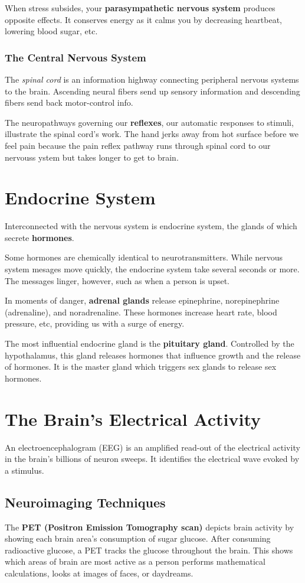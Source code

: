 \documentclass[12pt]{article}
\begin{document}
When stress subsides, your \textbf{parasympathetic nervous system} produces opposite effects. It conserves energy as it calms you by decreasing heartbeat, lowering blood sugar, etc. 

\subsubsection*{The Central Nervous System}
The \textit{spinal cord} is an information highway connecting peripheral nervous systems to the brain. Ascending neural fibers send up sensory information and descending fibers send back motor-control info. 

The neuropathways governing our \textbf{reflexes}, our automatic responses to stimuli, illustrate the spinal cord's work. The hand jerks away from hot surface before we feel pain because the pain reflex pathway runs through spinal cord to our nervouss ystem but takes longer to get to brain.

\section*{Endocrine System}
Interconnected with the nervous system is endocrine system, the glands of which secrete \textbf{hormones}.

Some hormones are chemically identical to neurotransmitters. While nervous system mesages move quickly, the endocrine system take several seconds or more. The messages linger, however, such as when a person is upset.

In moments of danger, \textbf{adrenal glands} release epinephrine, norepinephrine (adrenaline), and noradrenaline. These hormones increase heart rate, blood pressure, etc, providing us with a surge of energy.

The most influential endocrine gland is the \textbf{pituitary gland}. Controlled by the hypothalamus, this gland releases hormones that influence growth and the release of hormones. It is the master gland which triggers sex glands to release sex hormones. 

\section*{The Brain's Electrical Activity}
An electroencephalogram (EEG) is an amplified read-out of the electrical activity in the brain's billions of neuron sweeps. It identifies the electrical wave evoked by a stimulus.

\subsection*{Neuroimaging Techniques}
The \textbf{PET (Positron Emission Tomography scan)} depicts brain activity by showing each brain area's consumption of sugar glucose. After consuming radioactive glucose, a PET tracks the glucose throughout the brain. This shows which areas of brain are most active as a person performs mathematical calculations, looks at images of faces, or daydreams. 
\end{document}
